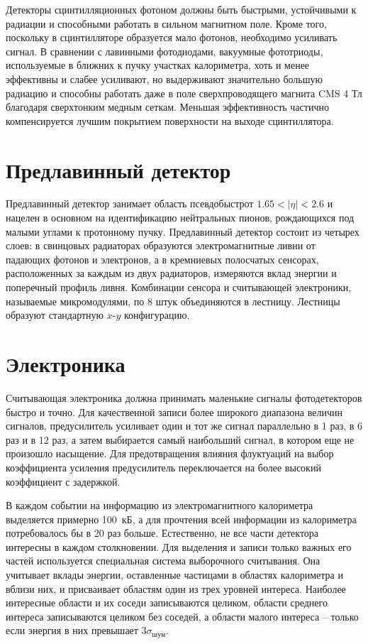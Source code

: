 \documentclass[a4paper, 10pt, twocolumn]{article}
\begin{document}
Детекторы сцинтилляционных фотоном должны быть быстрыми, устойчивыми к радиации и способными работать в сильном магнитном поле. 
Кроме того, поскольку в сцинтилляторе образуется мало фотонов, необходимо усиливать сигнал. 
В сравнении с лавинными фотодиодами, вакуумные фототриоды, используемые в ближних к пучку участках калориметра, хоть и менее эффективны и слабее усиливают, но выдерживают значительно большую радиацию и способны работать даже в поле сверхпроводящего магнита CMS 4 Тл благодаря сверхтонким медным сеткам. 
Меньшая эффективность частично компенсируется лучшим покрытием поверхности на выходе сцинтиллятора. 

\section{Предлавинный детектор}
Предлавинный детектор занимает область псевдобыстрот  $1.65<|\eta|<2.6$ и нацелен в основном на идентификацию нейтральных пионов, рождающихся под малыми углами к протонному пучку.
Предлавинный детектор состоит из четырех слоев: в свинцовых радиаторах образуются электромагнитные ливни от падающих фотонов и электронов, а в кремниевых полосчатых сенсорах, расположенных за каждым из двух радиаторов, измеряются вклад энергии и поперечный профиль ливня.
Комбинации сенсора и считывающей электроники, называемые микромодулями, по 8 штук объединяются в лестницу. Лестницы образуют стандартную $x$-$y$ конфигурацию. 


\section{Электроника}
Считывающая электроника должна принимать маленькие сигналы фотодетекторов быстро и точно. 
Для качественной записи более широкого диапазона величин сигналов, предусилитель усиливает один и тот же сигнал параллельно в 1 раз, в 6 раз и в 12 раз, а затем выбирается самый наибольший сигнал, в котором еще не произошло насыщение. 
Для предотвращения влияния флуктуаций на выбор коэффициента усиления предусилитель переключается на более высокий коэффициент с задержкой.

В каждом событии на информацию из электромагнитного калориметра выделяется примерно 100~кБ, а для прочтения всей информации из калориметра потребовалось бы в 20 раз больше.
Естественно, не все части детектора интересны в каждом столкновении.
Для выделения и записи только важных его частей используется специальная система выборочного считывания.
Она учитывает вклады энергии, оставленные частицами в областях калориметра и вблизи них, и присваивает областям один из трех уровней интереса.
Наиболее интересные области и их соседи записываются целиком, области среднего интереса записываются целиком без соседей, а области малого интереса -- только если энергия в них превышает $3\sigma_\text{шум}$. 
\end{document}
